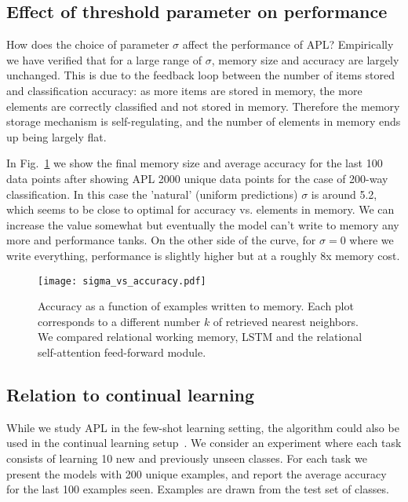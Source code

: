 \documentclass{article} \usepackage{iclr2019_conference,times}
\begin{document}
\subsection{Effect of threshold parameter on performance}

How does the choice of parameter $\sigma$ affect the performance of APL? Empirically we have verified that for a large range of $\sigma$, memory size and accuracy are largely unchanged. This is due to the feedback loop between the number of items stored and classification accuracy: as more items are stored in memory, the more elements are correctly classified and not stored in memory. Therefore the memory storage mechanism is self-regulating, and the number of elements in memory ends up being largely flat. 

In Fig.~\ref{fig:sigma} we show the final memory size and average accuracy for the last 100 data points after showing APL 2000 unique data points for the case of 200-way classification. In this case the 'natural' (uniform predictions) $\sigma$ is around 5.2, which seems to be close to optimal for accuracy vs. elements in memory. We can increase the value somewhat but eventually the model can't write to memory any more and performance tanks. On the other side of the curve, for $\sigma = 0$ where we write everything, performance is slightly higher but at a roughly 8x memory cost.

\begin{figure}[ht!]
\begin{center}
\texttt{[image: sigma\_vs\_accuracy.pdf]}
\end{center}
\caption{Accuracy as a function of examples written to memory. Each plot corresponds to a different number $k$ of retrieved nearest neighbors. We compared relational working memory, LSTM and the relational self-attention feed-forward module.}
\label{fig:sigma}
\end{figure}

\subsection{Relation to continual learning}

While we study APL in the few-shot learning setting, the algorithm could also be used in the continual learning setup~\citep{kirkpatrick2017overcoming, rusu2016progressive, yoon2018lifelong, rebuffi2017icarl}. We consider an experiment where each task consists of learning 10 new and previously unseen classes. For each task we present the models with 200 unique examples, and report the average accuracy for the last 100 examples seen. Examples are drawn from the test set of classes.
\end{document}
